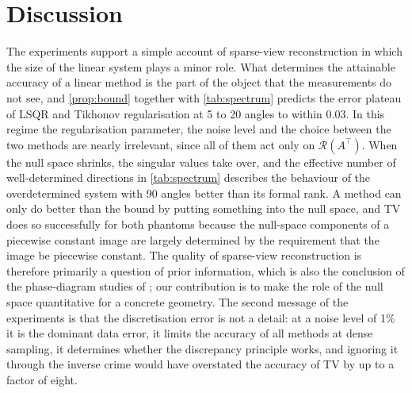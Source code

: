 \documentclass[11pt,a4paper]{article}
\numberwithin{equation}{section}
\theoremstyle{remark}
\newcommand{\RR}{\mathcal{R}}
\newcommand{\T}{\top}
\begin{document}
\section{Discussion}\label{sec:discussion}

The experiments support a simple account of sparse-view reconstruction in which the size of the linear system plays a minor role. What determines the attainable accuracy of a linear method is the part of the object that the measurements do not see, and \cref{prop:bound} together with \cref{tab:spectrum} predicts the error plateau of LSQR and Tikhonov regularisation at 5 to 20 angles to within 0.03. In this regime the regularisation parameter, the noise level and the choice between the two methods are nearly irrelevant, since all of them act only on $\RR(A^\T)$. When the null space shrinks, the singular values take over, and the effective number of well-determined directions in \cref{tab:spectrum} describes the behaviour of the overdetermined system with 90 angles better than its formal rank. A method can only do better than the bound by putting something into the null space, and TV does so successfully for both phantoms because the null-space components of a piecewise constant image are largely determined by the requirement that the image be piecewise constant. The quality of sparse-view reconstruction is therefore primarily a question of prior information, which is also the conclusion of the phase-diagram studies of \citep{jorgensen2015}; our contribution is to make the role of the null space quantitative for a concrete geometry. The second message of the experiments is that the discretisation error is not a detail: at a noise level of 1\% it is the dominant data error, it limits the accuracy of all methods at dense sampling, it determines whether the discrepancy principle works, and ignoring it through the inverse crime would have overstated the accuracy of TV by up to a factor of eight.
\end{document}
